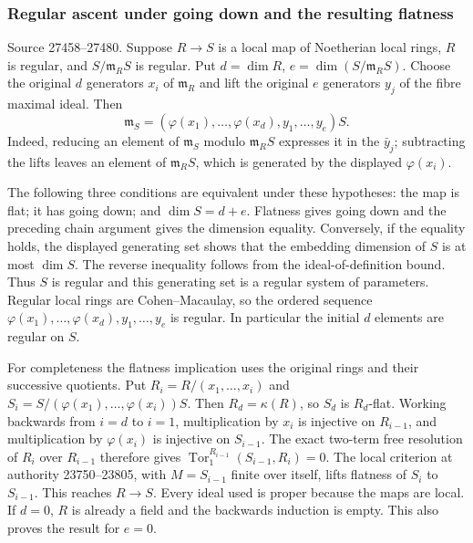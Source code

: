 \subsubsection{Regular ascent under going down and the resulting flatness}\label{algebra-proof-024-regular-ascent-under-going-down-and-the-resulting-flatness}

Source 27458--27480. Suppose \(R\to S\) is a local map of Noetherian local rings, \(R\) is regular, and \(S/\mathfrak m_RS\) is regular. Put \(d=\dim R\), \(e=\dim(S/\mathfrak m_RS)\). Choose the original \(d\) generators \(x_i\) of \(\mathfrak m_R\) and lift the original \(e\) generators \(y_j\) of the fibre maximal ideal. Then \[
 \mathfrak m_S=(\varphi(x_1),\ldots,\varphi(x_d),y_1,\ldots,y_e)S.
\] Indeed, reducing an element of \(\mathfrak m_S\) modulo \(\mathfrak m_RS\) expresses it in the \(\bar y_j\); subtracting the lifts leaves an element of \(\mathfrak m_RS\), which is generated by the displayed \(\varphi(x_i)\).

The following three conditions are equivalent under these hypotheses: the map is flat; it has going down; and \(\dim S=d+e\). Flatness gives going down and the preceding chain argument gives the dimension equality. Conversely, if the equality holds, the displayed generating set shows that the embedding dimension of \(S\) is at most \(\dim S\). The reverse inequality follows from the ideal-of-definition bound. Thus \(S\) is regular and this generating set is a regular system of parameters. Regular local rings are Cohen--Macaulay, so the ordered sequence \(\varphi(x_1),\ldots,\varphi(x_d),y_1,\ldots,y_e\) is regular. In particular the initial \(d\) elements are regular on \(S\).

For completeness the flatness implication uses the original rings and their successive quotients. Put \(R_i=R/(x_1,\ldots,x_i)\) and \(S_i=S/(\varphi(x_1),\ldots,\varphi(x_i))S\). Then \(R_d=\kappa(R)\), so \(S_d\) is \(R_d\)-flat. Working backwards from \(i=d\) to \(i=1\), multiplication by \(x_i\) is injective on \(R_{i-1}\), and multiplication by \(\varphi(x_i)\) is injective on \(S_{i-1}\). The exact two-term free resolution of \(R_i\) over \(R_{i-1}\) therefore gives \(\operatorname{Tor}_1^{R_{i-1}}(S_{i-1},R_i)=0\). The local criterion at authority 23750--23805, with \(M=S_{i-1}\) finite over itself, lifts flatness of \(S_i\) to \(S_{i-1}\). This reaches \(R\to S\). Every ideal used is proper because the maps are local. If \(d=0\), \(R\) is already a field and the backwards induction is empty. This also proves the result for \(e=0\).

